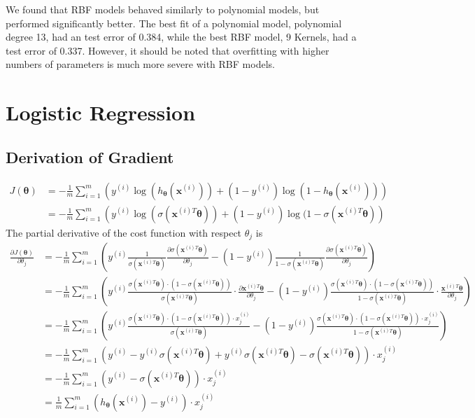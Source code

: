\documentclass[a4paper]{article}
\begin{document}
We found that RBF models behaved similarly to polynomial models, but performed significantly better.  The best fit of a polynomial model, polynomial degree 13, had an test error of 0.384, while the best RBF model, 9 Kernels, had a test error of 0.337.  However, it should be noted that overfitting with higher numbers of parameters is much more severe with RBF models.

\section{Logistic Regression}
\subsection{Derivation of Gradient}
\[
  \begin{split}
    J(\bm{\theta}) &= -\frac{1}{m} \sum_{i=1}^{m} \left( y^{(i)} \log (h_{\bm{\theta}}(\bm{x}^{(i)}))
    + (1-y^{(i)} ) \log (1 - h_{\bm{\theta}}(\bm{x}^{(i)}))  \right) \\
    &=  -\frac{1}{m} \sum_{i=1}^{m} \left( y^{(i)} \log (\sigma(\bm{x}^{(i)T}\bm{\theta}))
    + (1-y^{(i)} ) \log (1 - \sigma(\bm{x}^{(i)T}\bm{\theta})  \right)
  \end{split}
\]
The partial derivative of the cost function with respect $\theta_j$ is
\[
  \begin{split}
    \frac{\partial J(\bm{\theta})}{\partial \theta_j }
    &= -\frac{1}{m} \sum_{i=1}^m \left(
    y^{(i)} \frac{1}{\sigma(\bm{x}^{(i)T}\bm{\theta})} \frac{\partial \sigma(\bm{x}^{(i)T}\bm{\theta})}{\partial \theta_j}
    - (1-y^{(i)}) \frac{1}{1-\sigma(\bm{x}^{(i)T}\bm{\theta})} \frac{\partial \sigma(\bm{x}^{(i)T}\bm{\theta})}{\partial \theta_j}
    \right) \\
    &= -\frac{1}{m} \sum_{i=1}^m \left(
    y^{(i)} \frac{\sigma(\bm{x}^{(i)T}\bm{\theta}) \cdot (1 - \sigma(\bm{x}^{(i)T}\bm{\theta}))}{\sigma(\bm{x}^{(i)T}\bm{\theta})} \cdot \frac{\partial \bm{x}^{(i)T}\bm{\theta}}{\partial \theta_j}
    - (1 - y^{(i)}) \frac{\sigma(\bm{x}^{(i)T}\bm{\theta}) \cdot (1 - \sigma(\bm{x}^{(i)T}\bm{\theta}))}{1 - \sigma(\bm{x}^{(i)T}\bm{\theta})} \cdot \frac{\bm{x}^{(i)T}\bm{\theta}}{\partial \theta_j}
    \right) \\
    &= -\frac{1}{m} \sum_{i=1}^{m} \left(
    y^{(i)} \frac{\sigma(\bm{x}^{(i)T}\bm{\theta}) \cdot (1 - \sigma(\bm{x}^{(i)T}\bm{\theta})) \cdot x_j^{(i)}}{\sigma(\bm{x}^{(i)T}\bm{\theta})}
    - (1 - y^{(i)}) \frac{\sigma(\bm{x}^{(i)T}\bm{\theta}) \cdot (1 - \sigma(\bm{x}^{(i)T}\bm{\theta})) \cdot x_j^{(i)}}{1 - \sigma(\bm{x}^{(i)T}\bm{\theta})}
    \right) \\
    &= - \frac{1}{m} \sum_{i=1}^m \left(
    y^{(i)} - y^{(i)} \sigma(\bm{x}^{(i)T}\bm{\theta}) + y^{(i)} \sigma(\bm{x}^{(i)T}\bm{\theta}) - \sigma(\bm{x}^{(i)T}\bm{\theta}) \right)\cdot x_j^{(i)} \\
    &= -\frac{1}{m} \sum_{i=1}^m \left(
    y^{(i)} - \sigma(\bm{x}^{(i)T}\bm{\theta})\right) \cdot x_j^{(i)} \\
    &= \frac{1}{m} \sum_{i=1}^m \left( h_{\bm{\theta}}(\bm{x}^{(i)}) - y^{(i)}\right) \cdot x_j^{(i)}
  \end{split}
\]
\end{document}
